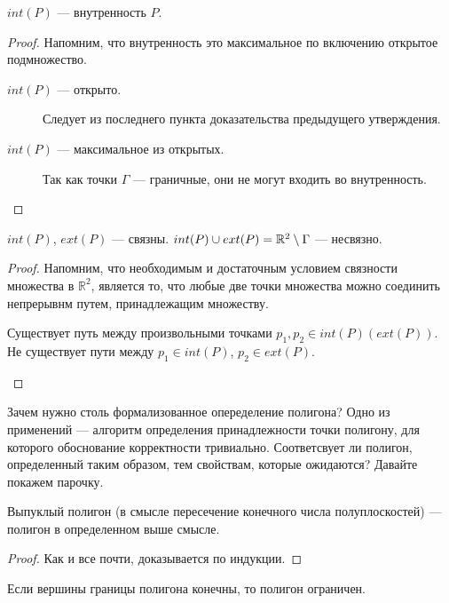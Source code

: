 \begin{statement}
\label{stat:Int}
$int(P)$ --- внутренность $P$.
\begin{proof} 
    Напомним, что внутренность это максимальное по включению открытое подмножество.
    \begin{description}
        \item [$int(P)$ --- открыто.] Следует из последнего пункта доказательства предыдущего утверждения.
        \item [$int(P)$ --- максимальное из открытых.] 
            Так как точки $\Gamma$ --- граничные, они не могут входить во внутренность.
    \end{description}
\end{proof}
\end{statement}

\begin{statement}
$int(P)$, $ext(P)$ --- связны. $int(P) \cup ext(P) = \mathbb{R}^2 \setminus \Gamma$ --- несвязно.
\begin{proof}
    Напомним, что необходимым и достаточным условием связности множества в $\mathbb{R}^2$, является то, что любые две 
    точки множества можно соединить непрерывнм путем, принадлежащим множеству.
\begin{description}
    \item [Существует путь между произвольными точками $p_1, p_2 \in int(P) \left( ext(P) \right)$.]
    \item [Не существует пути между $p_1 \in int(P)$, $p_2 \in ext(P)$.] 
\end{description}
\end{proof}
\end{statement}


Зачем нужно столь формализованное опеределение полигона? Одно из применений --- алгоритм определения принадлежности точки 
полигону, для которого обоснование корректности тривиально. Соответсвует ли полигон, определенный таким образом, 
тем свойствам, которые ожидаются? Давайте покажем парочку.

\begin{statement}
Выпуклый полигон (в смысле пересечение конечного числа полуплоскостей) --- полигон в определенном выше смысле.
\begin{proof}
Как и все почти, доказывается по индукции.
\end{proof}
\end{statement}

\begin{statement}
Если вершины границы полигона конечны, то полигон ограничен.    
\end{statement}
